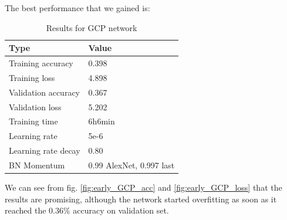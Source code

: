 The best performance that we gained is:
\begin{table}[!ht]
    \begin{center}
        \label{tab:GCP_early_results}
        \begin{tabular}{l|l}
            \rowcolor{gray!50}
            \textbf{Type} & \textbf{Value} \\
            \hline
            Training accuracy & 0.398\\
            Training loss & 4.898\\
            Validation accuracy & 0.367\\
            Validation loss & 5.202\\
            Training time & 6h6min\\
            Learning rate & 5e-6\\
            Learning rate decay & 0.80\\
            BN Momentum & 0.99 AlexNet, 0.997 last\\
            \hline
        \end{tabular}
    \end{center}
    \caption{Results for GCP network}
\end{table}
We can see from fig. \ref{fig:early_GCP_acc} and \ref{fig:early_GCP_loss} that the results are promising, although the network started overfitting as soon as it reached the 0.36\% accuracy on validation set.

